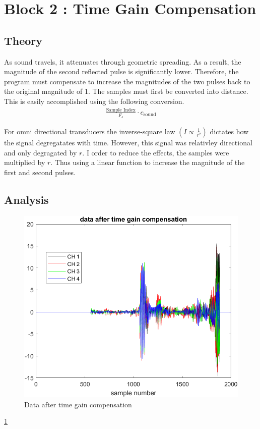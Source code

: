 \section{Block 2 : Time Gain Compensation}

    \subsection{Theory}
    As sound travels, it attenuates through geometric spreading.  As a result, the magnitude of the second reflected pulse is significantly lower. Therefore, the program must compensate to increase the magnitudes of the two pulses back to the original magnitude of 1. 
    The samples must first be converted into distance. This is easily accomplished using the following conversion.
    \begin{align*}
     \frac{\text{Sample Index}}{F_s} \cdot c_{\text{sound}}    
    \end{align*}
    

    For omni directional transducers the inverse-square law $(I \propto  \frac{1} {r^2} )$ dictates how the signal degregatates with time. However, this signal was relativley directional and only degragated by $r$. I order to reduce the effects, the samples were multiplied by $r$. Thus using a linear function to increase the magnitude of the first and second pulses.  


    \subsection{Analysis}

    \begin{figure}[H]
        \centering
        \includegraphics[width=0.5\linewidth]{figures/time_gain_1.png}
        \caption{Data after time gain compensation}
        \label{fig:time_gain1}
    \end{figure}

    \ref{fig:time_gain1}

